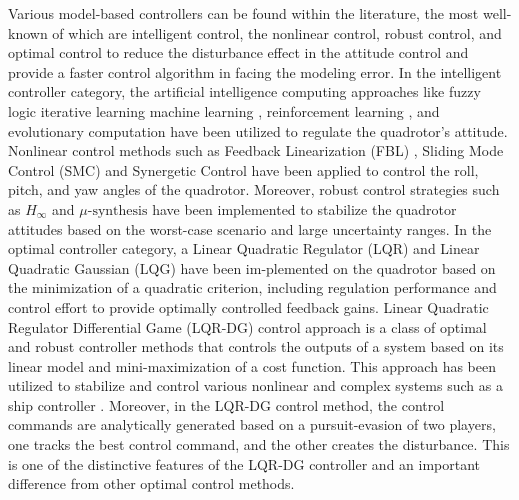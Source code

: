 \documentclass[3p,times]{elsarticle}
\begin{document}
Various model-based controllers can be found within the literature, the most well-known of which are intelligent control, the nonlinear control, robust control, and optimal control to reduce the disturbance effect in the attitude control and provide a faster control algorithm in facing the modeling error. In the intelligent controller category, the artificial intelligence computing approaches like fuzzy logic \cite{9782598} iterative learning \cite{electronics10202474} machine learning \cite{4564736}, reinforcement learning \cite{app11073257}, and evolutionary computation \cite{doi:10.2514/6.2013-5098} have been utilized to regulate the quadrotor's attitude.
Nonlinear control methods such as Feedback Linearization (FBL) \cite{article_Aboudonia}, Sliding Mode Control (SMC) \cite{7007285} and Synergetic Control \cite{article_Chara} have been applied to control the roll, pitch, and yaw angles of the quadrotor. Moreover, robust control strategies such as $H_{\infty}$ \cite{9283788, inproceedings_Hamza} and $\mu\text{-synthesis}$ \cite{inbook_Dean} have been implemented to stabilize the quadrotor attitudes based on the worst-case scenario and large uncertainty ranges. In the optimal controller category, a Linear Quadratic Regulator (LQR) \cite{7064553_LQR} and Linear Quadratic Gaussian (LQG) \cite{7367782} have been im-plemented on the quadrotor based on the minimization of a quadratic criterion, including regulation performance and control effort to provide optimally controlled feedback gains.
Linear Quadratic Regulator Differential Game (LQR-DG) control approach \cite{LQDG, article_Engwerda_min_max} is a class of optimal and robust controller methods that controls the outputs of a system based on its linear model and mini-maximization of a cost function. This approach has been utilized to stabilize and control various nonlinear and complex systems such as a ship controller \cite{6957349, 6160768}. Moreover, in the LQR-DG control method, the control commands are analytically generated based on a pursuit-evasion of two players, one tracks the best control command, and the other creates the disturbance. This is one of the distinctive features of the LQR-DG controller and an important difference from other optimal control methods.
\end{document}
